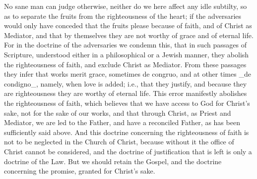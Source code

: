 No sane man can judge otherwise, neither do we here affect any idle
subtilty, so as to separate the fruits from the righteousness of the
heart; if the adversaries would only have conceded that the fruits
please because of faith, and of Christ as Mediator, and that by
themselves they are not worthy of grace and of eternal life.  For in
the doctrine of the adversaries we condemn this, that in such
passages of Scripture, understood either in a philosophical or a
Jewish manner, they abolish the righteousness of faith, and exclude
Christ as Mediator.  From these passages they infer that works merit
grace, sometimes de congruo, and at other times _de condigno_, namely,
when love is added; i.e., that they justify, and because they are
righteousness they are worthy of eternal life.  This error manifestly
abolishes the righteousness of faith, which believes that we have
access to God for Christ's sake, not for the sake of our works, and
that through Christ, as Priest and Mediator, we are led to the Father,
and have a reconciled Father, as has been sufficiently said above.
And this doctrine concerning the righteousness of faith is not to be
neglected in the Church of Christ, because without it the office of
Christ cannot be considered, and the doctrine of justification that
is left is only a doctrine of the Law.  But we should retain the
Gospel, and the doctrine concerning the promise, granted for Christ's
sake.

